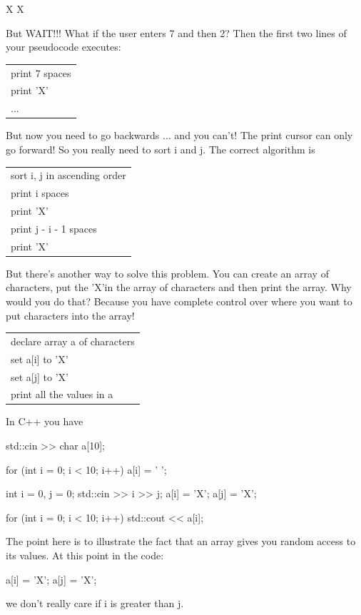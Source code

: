 \begin{consolethree}[escapeinside=||]
 X        X 
\end{consolethree}

But WAIT!!! What if the user enters 7 and then 2? Then the first two lines of your pseudocode executes:\\

\begin{tabular}{l}
print 7 spaces\\
print 'X'\\
...\\
\end{tabular}

But now you need to go backwards ... and you can't! The print cursor can only go forward! So you really need to sort i and j. The correct algorithm is\\

\begin{tabular}{l}
sort i, j in ascending order\\
print i spaces\\
print 'X'\\
print j - i - 1 spaces\\
print 'X'\\
\end{tabular}

But there's another way to solve this problem. You can create an array of characters, put the 'X'in the array of characters and then print the array. Why would you do that? Because you have complete control over where you want to put characters into the array!

\begin{tabular}{l}\\
declare array a of characters\\
set a[i] to 'X'\\
set a[j] to 'X'\\
print all the values in a\\
\end{tabular}

In C++ you have

\begin{consolethree}[escapeinside=||]
std::cin >> char a[10];

for (int i = 0; i < 10; i++)
{
    a[i] = ' ';
}

int i = 0, j = 0;
std::cin >> i >> j;
a[i] = 'X';
a[j] = 'X';

for (int i = 0; i < 10; i++)
{
    std::cout << a[i];
} 
\end{consolethree}

The point here is to illustrate the fact that an array gives you random access to its values. At this point in the code:

\begin{consolethree}[escapeinside=||]
a[i] = 'X';
a[j] = 'X'; 
\end{consolethree}

we don't really care if i is greater than j.



